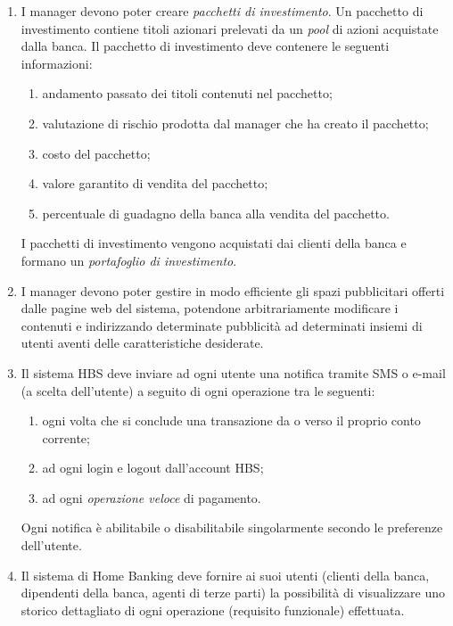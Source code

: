 \begin{enumerate}
\begin{enumerate}
			\item da quanto tempo il correntista \`e cliente presso la banca;
			\item eventuali altri parametri.
		\end{enumerate}
	\item I manager devono poter creare \emph{pacchetti di investimento}.
		Un pacchetto di investimento contiene titoli azionari prelevati da un \emph{pool} di azioni acquistate dalla banca.
		Il pacchetto di investimento deve contenere le seguenti informazioni:
		\begin{enumerate}
			\item andamento passato dei titoli contenuti nel pacchetto;
			\item valutazione di rischio prodotta dal manager che ha creato il pacchetto;
			\item costo del pacchetto;
			\item valore garantito di vendita del pacchetto;
			\item percentuale di guadagno della banca alla vendita del pacchetto.
		\end{enumerate}
		I pacchetti di investimento vengono acquistati dai clienti della banca e formano un \emph{portafoglio di investimento}.
	\item I manager devono poter gestire in modo efficiente gli spazi pubblicitari offerti dalle pagine web del sistema, potendone arbitrariamente modificare i contenuti e indirizzando determinate pubblicità ad determinati insiemi di utenti aventi delle caratteristiche desiderate.
	\item Il sistema HBS deve inviare ad ogni utente una notifica tramite SMS o e-mail (a scelta dell'utente) a seguito di ogni operazione tra le seguenti:
		\begin{enumerate}
			\item ogni volta che si conclude una transazione da o verso il proprio conto corrente;
			\item ad ogni login e logout dall'account HBS;
			\item ad ogni \emph{operazione veloce} di pagamento.
		\end{enumerate}
	Ogni notifica \`e abilitabile o disabilitabile singolarmente secondo le preferenze dell'utente.
	\item Il sistema di Home Banking deve fornire ai suoi utenti (clienti della banca, dipendenti della banca, agenti di terze parti) la possibilit\`a di visualizzare uno storico dettagliato di ogni operazione (requisito funzionale) effettuata.
\end{enumerate}

